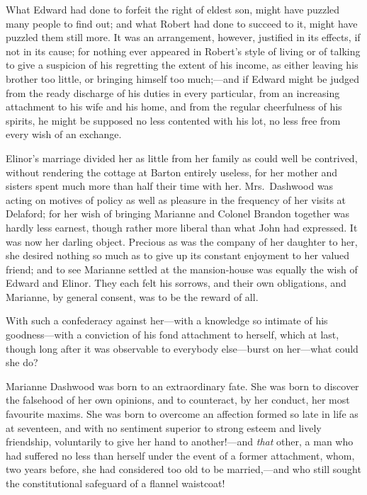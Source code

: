 What Edward had done to forfeit the right of eldest
son, might have puzzled many people to find out; and what
Robert had done to succeed to it, might have puzzled them
still more.  It was an arrangement, however, justified in
its effects, if not in its cause; for nothing ever
appeared in Robert's style of living or of talking to give
a suspicion of his regretting the extent of his income,
as either leaving his brother too little, or bringing
himself too much;---and if Edward might be judged from
the ready discharge of his duties in every particular,
from an increasing attachment to his wife and his home,
and from the regular cheerfulness of his spirits,
he might be supposed no less contented with his lot,
no less free from every wish of an exchange.

Elinor's marriage divided her as little from her
family as could well be contrived, without rendering
the cottage at Barton entirely useless, for her mother
and sisters spent much more than half their time with her.
Mrs.\ Dashwood was acting on motives of policy as well
as pleasure in the frequency of her visits at Delaford;
for her wish of bringing Marianne and Colonel Brandon together
was hardly less earnest, though rather more liberal than
what John had expressed.  It was now her darling object.
Precious as was the company of her daughter to her,
she desired nothing so much as to give up its constant
enjoyment to her valued friend; and to see Marianne settled at
the mansion-house was equally the wish of Edward and Elinor.
They each felt his sorrows, and their own obligations,
and Marianne, by general consent, was to be the reward
of all.

With such a confederacy against her---with a knowledge
so intimate of his goodness---with a conviction of his fond
attachment to herself, which at last, though long after it
was observable to everybody else---burst on her---what could she
do?

Marianne Dashwood was born to an extraordinary fate.
She was born to discover the falsehood of her own opinions,
and to counteract, by her conduct, her most favourite maxims.
She was born to overcome an affection formed so late
in life as at seventeen, and with no sentiment
superior to strong esteem and lively friendship,
voluntarily to give her hand to another!---and \emph{that} other,
a man who had suffered no less than herself under the
event of a former attachment, whom, two years before,
she had considered too old to be married,---and who still
sought the constitutional safeguard of a flannel waistcoat!

